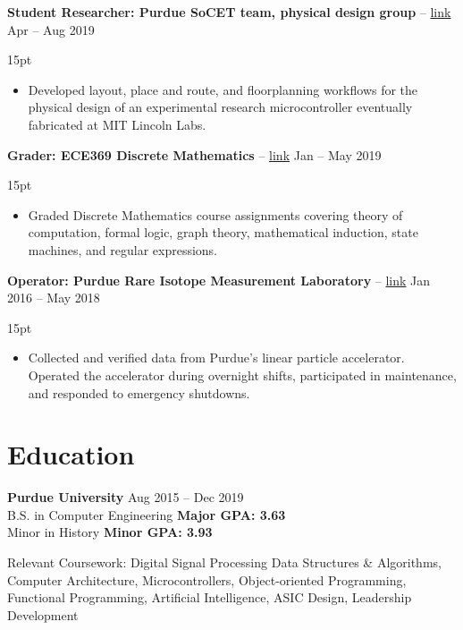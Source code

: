 \documentclass[10pt,letterpaper]{article}
\newcommand{\resumeItem}[4]{
	\begingroup
	\def\link{#2}
	\textbf{#1}
	\ifx\link\empty \else 
		-- \href{#2}{link}
	\fi
	\hfill #3\\
	\begin{adjustwidth}{15pt}{}
	#4
	\end{adjustwidth}
	\endgroup
}
\begin{document}
\resumeItem
{Student Researcher: Purdue SoCET team, physical design group}
{}
{Apr -- Aug 2019}
{
\begin{itemize}
	\item Developed layout, place and route, and floorplanning workflows for the physical design of an experimental research microcontroller eventually fabricated at MIT Lincoln Labs.
\end{itemize}
}

\resumeItem
{Grader: ECE369 Discrete Mathematics}
{}
{Jan -- May 2019}
{
\begin{itemize}
	\item Graded Discrete Mathematics course assignments covering theory of computation, formal logic, graph theory, mathematical induction, state machines, and regular expressions.
\end{itemize}
}

\resumeItem
{Operator: Purdue Rare Isotope Measurement Laboratory}
{}
{Jan 2016 -- May 2018}
{
\begin{itemize}
	\item Collected and verified data from Purdue's linear particle accelerator. Operated the accelerator during overnight shifts, participated in maintenance, and responded to emergency shutdowns.
\end{itemize}
}

\section*{Education}
\textbf{Purdue University} \hfill Aug 2015 -- Dec 2019 \\
B.S. in Computer Engineering \textbf{Major GPA: 3.63} \\
Minor in History \textbf{Minor GPA: 3.93}

\vspace{2pt}
Relevant Coursework:
Digital Signal Processing
Data Structures \& Algorithms,
Computer Architecture,
Microcontrollers,
Object-oriented Programming,
Functional Programming,
Artificial Intelligence,
ASIC Design,
Leadership Development
\end{document}
